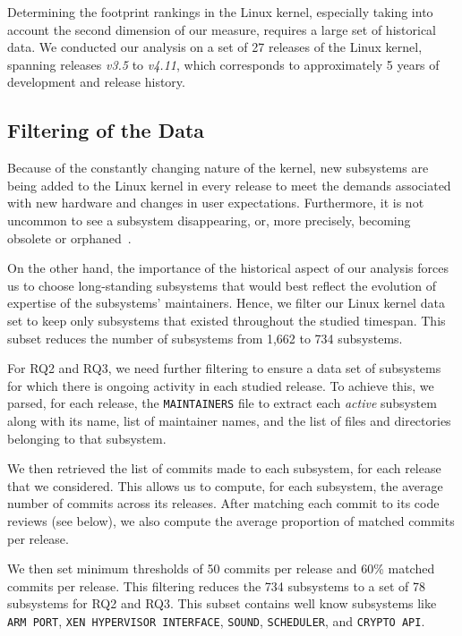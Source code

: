 Determining the footprint rankings in the Linux kernel, especially taking into account the second dimension of our measure, requires a large set of historical data. We conducted our analysis on a set of 27 releases of the Linux kernel, spanning releases \textit{v3.5} to \textit{v4.11}, which corresponds to approximately 5 years of development and release history. 


\subsection{Filtering of the Data}
\label{sec:data-filtering}

Because of the constantly changing nature of the kernel, new subsystems are being added to the Linux kernel in every release to meet the demands associated with new hardware and changes in user expectations. Furthermore, it is not uncommon to see a subsystem disappearing, or, more precisely, becoming obsolete or orphaned~\cite[v4.11, \texttt{MAINTAINERS}, Line~84]{linux}.

On the other hand, the importance of the historical aspect of our analysis forces us to choose long-standing subsystems that would best reflect the evolution of expertise of the subsystems' maintainers. Hence, we filter our Linux kernel data set to keep only subsystems that existed throughout the studied timespan. This subset reduces the number of subsystems from 1,662 to 734 subsystems.

For RQ2 and RQ3, we need further filtering to ensure a data set of subsystems for which there is ongoing activity in each studied release. To achieve this, we %
parsed, for each release, the \texttt{MAINTAINERS} file to extract each \textit{active} subsystem along with its name, list of maintainer names, and the list of files and directories belonging to that subsystem.

We then retrieved the list of commits made to each subsystem, for each release that we considered. This allows us to compute, for each subsystem, the average number of commits across its releases. After matching each commit to its code reviews (see below), we also compute the average proportion of matched commits per release.

We then set minimum thresholds of 50 commits per release and 60\% matched commits per release. This filtering reduces the 734 subsystems to a set of 78 subsystems for RQ2 and RQ3. This subset contains well know subsystems like \texttt{ARM PORT}, \texttt{XEN HYPERVISOR INTERFACE}, \texttt{SOUND}, \texttt{SCHEDULER}, and \texttt{CRYPTO API}.

